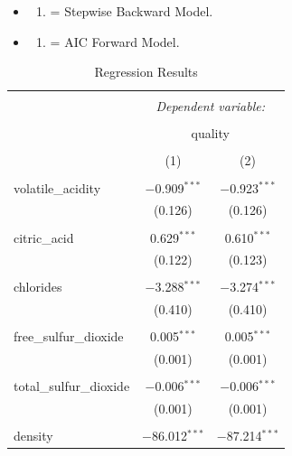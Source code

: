 \documentclass[a4paper,9pt,twocolumn,twoside,]{pinp}
\providecommand{\tightlist}{%
  \setlength{\itemsep}{0pt}\setlength{\parskip}{0pt}}
\begin{document}
\begin{itemize}
\item
  \begin{enumerate}
  \def\labelenumi{(\arabic{enumi})}
  \tightlist
  \item
    = Stepwise Backward Model.
  \end{enumerate}
\item
  \begin{enumerate}
  \def\labelenumi{(\arabic{enumi})}
  \setcounter{enumi}{1}
  \tightlist
  \item
    = AIC Forward Model.
  \end{enumerate}
\end{itemize}

\begin{table}[!htbp] \centering 
  \caption{Regression Results} 
  \label{} 
\begin{tabular}{@{\extracolsep{5pt}}lcc} 
\\[-1.8ex]\hline 
\hline \\[-1.8ex] 
 & \multicolumn{2}{c}{\textit{Dependent variable:}} \\ 
\cline{2-3} 
\\[-1.8ex] & \multicolumn{2}{c}{quality} \\ 
\\[-1.8ex] & (1) & (2)\\ 
\hline \\[-1.8ex] 
 volatile\_acidity & $-$0.909$^{***}$ & $-$0.923$^{***}$ \\ 
  & (0.126) & (0.126) \\ 
  & & \\ 
 citric\_acid & 0.629$^{***}$ & 0.610$^{***}$ \\ 
  & (0.122) & (0.123) \\ 
  & & \\ 
 chlorides & $-$3.288$^{***}$ & $-$3.274$^{***}$ \\ 
  & (0.410) & (0.410) \\ 
  & & \\ 
 free\_sulfur\_dioxide & 0.005$^{***}$ & 0.005$^{***}$ \\ 
  & (0.001) & (0.001) \\ 
  & & \\ 
 total\_sulfur\_dioxide & $-$0.006$^{***}$ & $-$0.006$^{***}$ \\ 
  & (0.001) & (0.001) \\ 
  & & \\ 
 density & $-$86.012$^{***}$ & $-$87.214$^{***}$ \\ 

\end{tabular}
\end{table}
\end{document}
